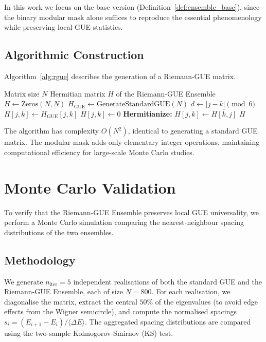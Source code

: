 \documentclass[12pt,a4paper]{article}
\theoremstyle{plain}
\theoremstyle{definition}
\theoremstyle{remark}
\begin{document}
In this work we focus on the base version (Definition~\ref{def:ensemble_base}), since the binary modular mask alone suffices to reproduce the essential phenomenology while preserving local GUE statistics.

\subsection{Algorithmic Construction}
Algorithm~\ref{alg:rgue} describes the generation of a Riemann-GUE matrix.

\begin{algorithm}[H]
\caption{Generation of the Riemann-GUE Ensemble (Base Version)}
\label{alg:rgue}
\begin{algorithmic}[1]
\Require Matrix size $N$
\Ensure Hermitian matrix $H$ of the Riemann-GUE Ensemble
    \State $H \gets \text{Zeros}(N, N)$
    \State $H_{\text{GUE}} \gets \text{GenerateStandardGUE}(N)$
            \State $d \gets |j - k| \pmod 6$
                \State $H[j, k] \gets H_{\text{GUE}}[j, k]$
            \Else
                \State $H[j, k] \gets 0$
            \EndIf
        \EndFor
    \EndFor
    \State \textbf{Hermitianize:}
            \State $H[j, k] \gets \overline{H[k, j]}$
        \EndFor
    \EndFor
    \State \Return $H$
\EndFunction
\end{algorithmic}
\end{algorithm}

The algorithm has complexity $O(N^2)$, identical to generating a standard GUE matrix. The modular mask adds only elementary integer operations, maintaining computational efficiency for large-scale Monte Carlo studies.

\section{Monte Carlo Validation}
\label{sec:monte_carlo}

To verify that the Riemann-GUE Ensemble preserves local GUE universality, we perform a Monte Carlo simulation comparing the nearest-neighbour spacing distributions of the two ensembles.

\subsection{Methodology}
We generate $n_{\text{iter}} = 5$ independent realisations of both the standard GUE and the Riemann-GUE Ensemble, each of size $N = 800$. For each realisation, we diagonalise the matrix, extract the central $50\%$ of the eigenvalues (to avoid edge effects from the Wigner semicircle), and compute the normalised spacings $s_i = (E_{i+1} - E_i) / \langle \Delta E \rangle$. The aggregated spacing distributions are compared using the two-sample Kolmogorov-Smirnov (KS) test.
\end{document}

